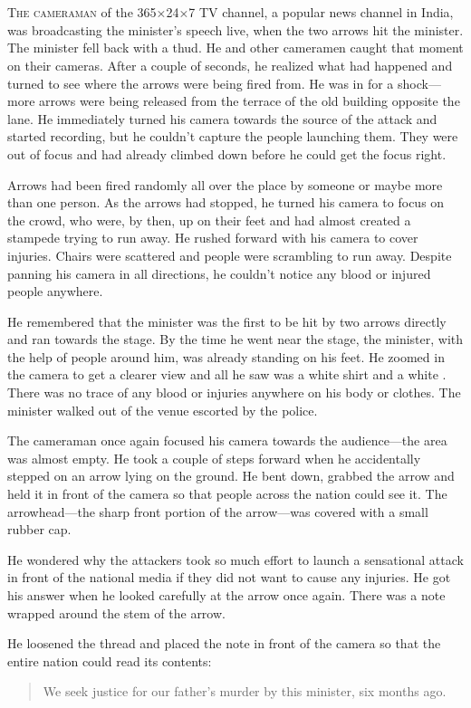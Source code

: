 \chapter{}

\lettrine{T}{he cameraman} of the 365×24×7 TV channel, a popular news channel in
India, was broadcasting the minister's speech live, when
the two arrows hit the minister. The minister fell back with a thud. He and
other cameramen caught that moment on their cameras. After a couple of seconds,
he realized what had happened and turned to see where the arrows were being fired
from.  He was in for a shock—more arrows were being released from the terrace of
the old building opposite the lane. He immediately turned his camera towards the
source of the attack and started recording, but he couldn't capture the people
launching them. They were out of focus and had already climbed down before he
could get the focus right.

Arrows had been fired randomly all over the place by someone or maybe more than one
person. As the arrows had stopped, he turned his camera to focus on the crowd, who
were, by then, up on their feet and had almost created a stampede trying to run
away. He rushed forward with his camera to cover injuries. Chairs were scattered
and people were scrambling to run away. Despite panning his camera in all
directions, he couldn't notice any blood or injured people anywhere.

He remembered that the minister was the first to be hit by two arrows directly
and ran towards the stage. By the time he went near the stage, the minister,
with the help of people around him, was already standing on his feet. He zoomed
in the camera to get a clearer view and all he saw was a white shirt and a white
. There was no trace of any blood or injuries anywhere on his
body or clothes. The minister walked out of the venue escorted by the police.

The cameraman once again focused his camera towards the audience—the area was
almost empty. He took a couple of steps forward when he accidentally stepped on
an arrow lying on the ground. He bent down, grabbed the arrow and held it in
front of the camera so that people across the nation could see it. The
arrowhead—the sharp front portion of the arrow—was covered with a small rubber
cap.

He wondered why the attackers took so much effort to launch a sensational attack
in front of the national media if they did not want to cause any injuries. He
got his answer when he looked carefully at the arrow once again. There was a
note wrapped around the stem of the arrow.

He loosened the thread and placed the note in front of the camera so that the
entire nation could read its contents:
\begin{quote}
    We seek justice for our father's murder by this minister, six months ago.
\end{quote}